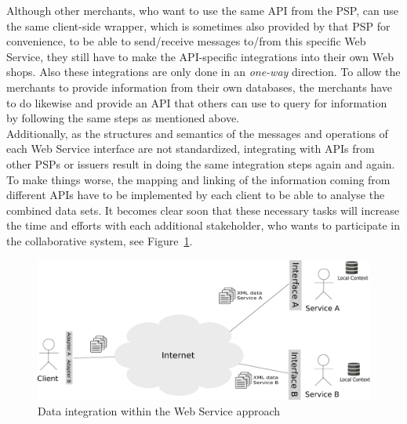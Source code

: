 Although other merchants, who want to use the same \gls{API} from the \gls{PSP}, can use the same client-side wrapper, which is sometimes also provided by that \gls{PSP} for convenience, to be able to send/receive messages to/from this specific Web Service, they still have to make the \gls{API}-specific integrations into their own Web shops. Also these integrations are only done in an \emph{one-way} direction. To allow the merchants to provide information from their own databases, the merchants have to do likewise and provide an \gls{API} that others can use to query for information by following the same steps as mentioned above. \\

Additionally, as the structures and semantics of the messages and operations of each Web Service interface are not standardized, integrating with \gls{API}s from other \gls{PSP}s or issuers result in doing the same integration steps again and again. To make things worse, the mapping and linking of the information coming from different \gls{API}s have to be implemented by each client to be able to analyse the combined data sets. It becomes clear soon that these necessary tasks will increase the time and efforts with each additional stakeholder, who wants to participate in the collaborative system, see Figure~\ref{fig:web_services_scenario}. \\

\begin{figure}[!ht]
  \centering
  \includegraphics[width=0.9\columnwidth]{images/web-services-scenario.pdf}
  \caption{Data integration within the Web Service approach}
\label{fig:web_services_scenario}
\end{figure}

